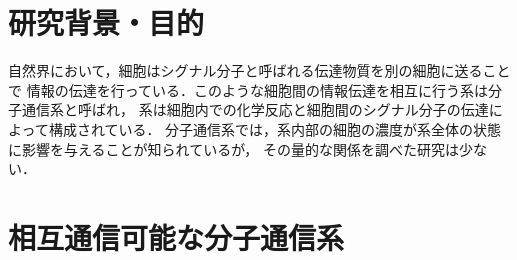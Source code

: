 \documentclass[twocolumn]{jarticle}
\begin{document}
\maketitle

\section{研究背景・目的}
自然界において，細胞はシグナル分子と呼ばれる伝達物質を別の細胞に送ることで
情報の伝達を行っている．このような細胞間の情報伝達を相互に行う系は分子通信系と呼ばれ，
系は細胞内での化学反応と細胞間のシグナル分子の伝達によって構成されている．
分子通信系では，系内部の細胞の濃度が系全体の状態に影響を与えることが知られているが，
その量的な関係を調べた研究は少ない．


\section{相互通信可能な分子通信系}

\end{document}

